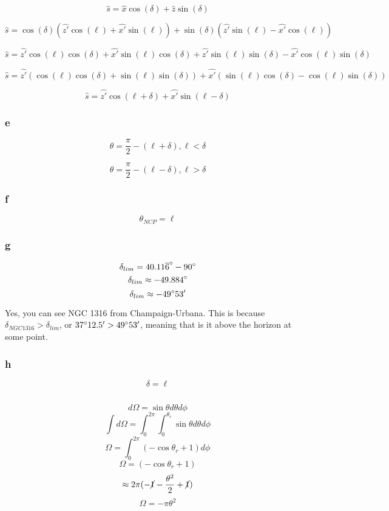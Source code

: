 \documentclass{article}
\begin{document}
\[\hat{s} = \hat{x}\cos(\delta) + \hat{z}\sin(\delta) \]


\[\hat{s} = \cos(\delta)(\hat{z'}\cos(\ell) + \hat{x'}\sin(\ell)) + \sin(\delta)(\hat{z'}\sin(\ell) - \hat{x'}\cos(\ell))\]

\[\hat{s} = \hat{z'}\cos(\ell)\cos(\delta) + \hat{x'}\sin(\ell)\cos(\delta) + \hat{z'}\sin(\ell)\sin(\delta) - \hat{x'}\cos(\ell)\sin(\delta)\]

\[\hat{s} = \hat{z'}(\cos(\ell)\cos(\delta) + \sin(\ell)\sin(\delta)) + \hat{x'}(\sin(\ell)\cos(\delta) - \cos(\ell)\sin(\delta))\]

\[\hat{s} = \hat{z'}\cos(\ell +\delta) + \hat{x'}\sin(\ell-\delta)\]

\subsubsection{e}

\[\theta = \frac{\pi}{2} - (\ell + \delta), \ell < \delta\]

\[\theta = \frac{\pi}{2} - (\ell - \delta), \ell > \delta\]

\subsubsection{f}

\[\theta_{NCP} = \ell\]
\subsubsection{g}

\[\delta_{lim} = 40.11\overline{6} \degree - 90\degree\]
\[\delta_{lim} \approx -49.884\degree \]
\[\delta_{lim} \approx -49\degree 53'\]

Yes, you can see  NGC 1316 from Champaign-Urbana. This is because $\delta_{NGC 1316} > \delta_{lim}$, or $37\degree12.5' > 49\degree 53'$, meaning that is it above the horizon at some point.

\subsubsection{h}
\[\delta = \ell\]

\subsection{}
\[d\Omega =\sin\theta d\theta d\phi\]
\[\int d\Omega = \int_{0}^{2\pi}\int_{0}^{\theta_{r}}\sin\theta d\theta d\phi\]
\[\Omega = \int_{0}^{2\pi}(-\cos\theta_{r} + 1) d\phi\]
\[\Omega = (-\cos\theta_{r} + 1)\]
\[\approx2\pi(-\cancel{1} -\frac{\theta^2}{2} +\cancel{1})\]
\[\Omega = -\pi\theta^2\]
\end{document}
